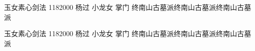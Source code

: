 \documentclass[doctor, vlined, ]{DissertUESTC}
\begin{document}
	
	\newcommand{\shad}[1]{\textcolor{DodgerBlue}{\ttfamily #1}}
	\newcommand{\shadcmd}[1]{\shad{$\backslash$#1}}




	



	\uestccover{}{}{}{}{}{}{}  %

				{玉女素心剑法}
				{1182000}
				{杨\hspace{1em}过}
				{小龙女}
				{掌\hspace{1em}门}
				{终南山古墓派终南山古墓派终南山古墓派}  %

				{玉女素心剑法}
				{1182000}
				{杨\hspace{1em}过}
				{小龙女}
				{掌\hspace{1em}门}
				{终南山古墓派终南山古墓派终南山古墓派}  %
\end{document}
